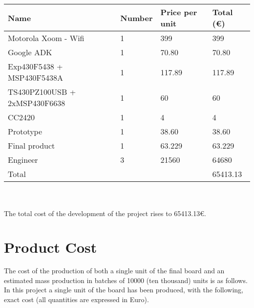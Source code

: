 \begin{tabular}{| p{5cm} |l | l | l |} 
\hline
   Name & Number& Price per unit & Total ({\small \euro})\\ \hline
   Motorola Xoom - Wifi & 1 & 399 & 399\\ \hline
   Google ADK & 1 & 70.80 & 70.80\\ \hline
   Exp430F5438 + MSP430F5438A & 1 & 117.89 & 117.89\\ \hline
   TS430PZ100USB + 2xMSP430F6638 & 1 & 60 & 60\\ \hline
   CC2420 & 1 & 4 & 4\\ \hline
   Prototype & 1 & 38.60 & 38.60\\ \hline
   Final product & 1 & 63.229 & 63.229\\ \hline
   Engineer & 3 & 21560 & 64680\\ \hline
   Total & & & 65413.13\\ \hline
\end{tabular}\\\\

	The total cost of the development of the project rises to 65413.13{\small \euro}. 

\chapter{Product Cost}
\label{ch:cost}

	The cost of the production of both a single unit of the final board and an estimated mass production in batches of 10000 (ten thousand) units is as follows.\\

	In this project a single unit of the board has been produced, with the following, exact cost (all quantities are expressed in Euro).\\

